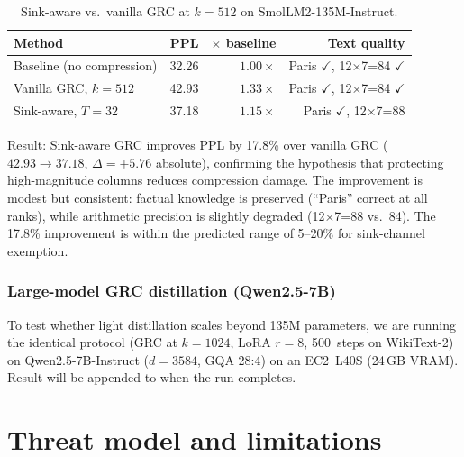 \documentclass[11pt]{article}
\begin{document}
\begin{table}[h]\centering\small
\caption{Sink-aware vs.\ vanilla GRC at $k{=}512$ on SmolLM2-135M-Instruct.}
\begin{tabular}{@{}lrrr@{}}
\toprule
Method & PPL & $\times$ baseline & Text quality \\
\midrule
Baseline (no compression) & 32.26 & $1.00{\times}$ & Paris $\checkmark$, 12×7=84 $\checkmark$ \\
Vanilla GRC, $k{=}512$  & 42.93 & $1.33{\times}$ & Paris $\checkmark$, 12×7=84 $\checkmark$ \\
Sink-aware, $T{=}32$     & 37.18 & $1.15{\times}$ & Paris $\checkmark$, 12×7=88 \\
\bottomrule
\end{tabular}
\end{table}

Result: Sink-aware GRC improves PPL by 17.8\% over vanilla GRC
($42.93\to 37.18$, $\Delta{=}+5.76$ absolute), confirming the
hypothesis that protecting high-magnitude columns reduces compression
damage.  The improvement is modest but consistent: factual knowledge
is preserved (``Paris'' correct at all ranks), while arithmetic
precision is slightly degraded (12×7=88 vs.\ 84).  The 17.8\%
improvement is within the predicted range of 5--20\% for sink-channel
exemption.

\subsubsection{Large-model GRC distillation (Qwen2.5-7B)}

To test whether light distillation scales beyond 135M parameters, we
are running the identical protocol (GRC at $k{=}1024$, LoRA $r{=}8$,
500~steps on WikiText-2) on Qwen2.5-7B-Instruct ($d{=}3584$, GQA
28:4) on an EC2~L40S (24\,GB VRAM).  Result will be appended to
 when the run completes.

\section{Threat model and limitations}
\label{sec:limits}
\end{document}
